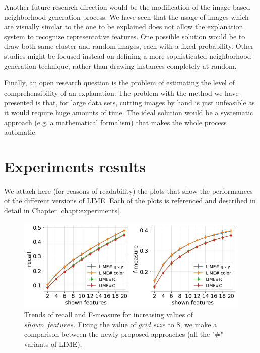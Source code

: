 \documentclass[12pt, twoside, a4paper]{report}
\newcommand{\whitepage}{\clearpage
						\thispagestyle{empty}
						\phantom{a}
						\vfill}
\begin{document}
Another future research direction would be the modification of the image-based neighborhood generation process. We have seen that the usage of images which are visually similar to the one to be explained does not allow the explanation system to recognize representative features. One possible solution would be to draw both same-cluster and random images, each with a fixed probability.
Other studies might be focused instead on defining a more sophisticated neighborhood generation technique, rather than drawing instances completely at random.

Finally, an open research question is the problem of estimating the level of comprehensibility of an explanation. The problem with the method we have presented is that, for large data sets, cutting images by hand is just unfeasible as it would require huge amounts of time. The ideal solution would be a systematic approach (e.g. a mathematical formalism) that makes the whole process automatic.



 

\whitepage

\appendix

\chapter{Experiments results}

We attach here (for reasons of readability) the plots that show the performances of the different versions of LIME. Each of the plots is referenced and described in detail in Chapter \ref{chapt:experiments}.

\bigskip

\begin{figure}[h]
\centering
\includegraphics[width=.9\textwidth]{images/overall-figs/rec-fmea.png} 
\caption{Trends of recall and F-measure for increasing values of $shown\_features$. Fixing the value of $grid\_size$ to 8, we make a comparison between the newly proposed approaches (all the "\#" variants of LIME).}
\label{fig:overall-rec-fmea}
\end{figure}
\end{document}
